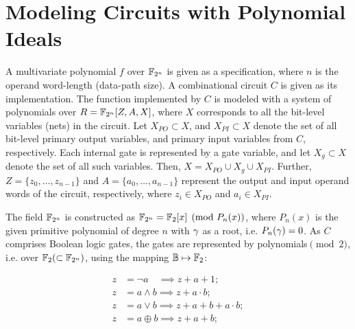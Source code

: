 \section{Modeling Circuits with Polynomial Ideals}\label{sec:pmodel} 



A multivariate polynomial $f$ over ${\mathbb{F}}_{2^n}$ is given as a specification,
where $n$ is the operand word-length (data-path size). A %
combinational circuit $C$ is given as its implementation. 
The function implemented by $C$ is modeled with a system of
polynomials over $R={\mathbb{F}}_{2^n}[Z,A,X]$, where $X$ corresponds to all the bit-level variables (nets) in the
circuit. Let $X_{PO} \subset X$, and $X_{PI} \subset X$ denote the set of all 
bit-level primary output variables, and primary input variables from $C$, respectively. 
Each internal gate is represented by a gate variable,
 and let $X_g \subset X$ denote the set of all such variables. Then,
 $X = X_{PO} \cup X_g \cup X_{PI}$. 
Further, $Z=\{z_0,\dots,z_{n-1}\}$ and $A = \{a_0,\dots,a_{n-1}\}$
represent the output and input operand words of the circuit, respectively,
where $z_i\in X_{PO}$ and $a_i\in X_{PI}$. 

The field ${\mathbb{F}}_{2^n}$ is constructed as ${\mathbb{F}}_{2^n} = {\mathbb{F}}_{2}[x]\pmod{P_n(x)}$, where
$P_n(x)$ is the given primitive polynomial of degree $n$
with $\gamma$ as a root, i.e. $P_n(\gamma) =0$. 
As $C$ comprises Boolean logic gates, the gates are represented by
polynomials$\pmod{2}$, i.e. over ${\mathbb{F}}_2 (\subset {\mathbb{F}}_{2^n})$, using the
mapping ${\mathbb{B}}\mapsto {\mathbb{F}}_2$:

\begin{equation}
\label{bool2poly}
\begin{split}
z &=  \neg a \quad\implies z+a+1;\\
z &=  a \wedge b \implies z+a \cdot b;\\
z &=  a \vee b \implies z+a+b+a \cdot b;\\
z &=  a \oplus b \implies z+a+b;
\end{split}
\end{equation}

